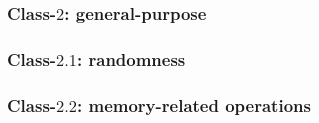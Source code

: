 %


\subsubsection{Class-$2$:   general-purpose}
\label{sec:bg:feature:2}


\subsubsection{Class-$2.1$: randomness}
\label{sec:bg:feature:2:1}

%
%
%


\subsubsection{Class-$2.2$: memory-related operations}
\label{sec:bg:feature:2:2}

